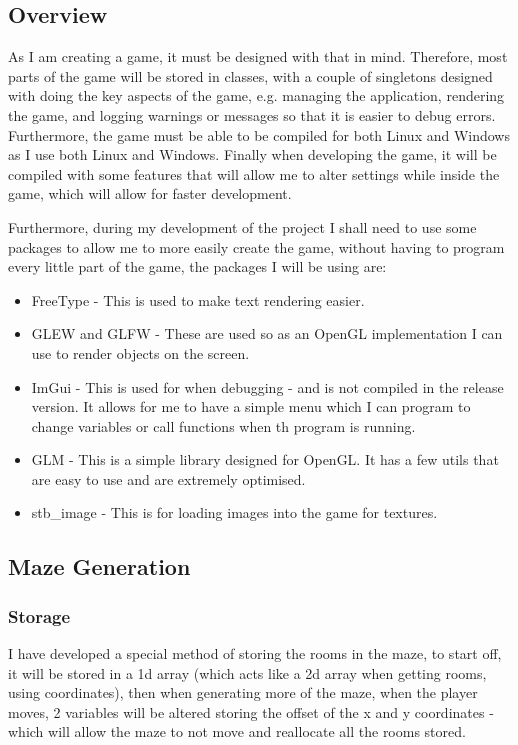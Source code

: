 \documentclass[../Main.tex]{subfiles}
\begin{document}
    \subsection{Overview}
        As I am creating a game, it must be designed with that in mind. Therefore, most parts of the game will be stored in classes, with a couple of singletons designed with doing the key aspects of the game, e.g. managing the application, rendering the game, and logging warnings or messages so that it is easier to debug errors. Furthermore, the game must be able to be compiled for both Linux and Windows as I use both Linux and Windows. Finally when developing the game, it will be compiled with some features that will allow me to alter settings while inside the game, which will allow for faster development.

        Furthermore, during my development of the project I shall need to use some packages to allow me to more easily create the game, without having to program every little part of the game, the packages I will be using are:
        \begin{itemize}
            \item FreeType - This is used to make text rendering easier.
            \item GLEW and GLFW - These are used so as an OpenGL implementation I can use to render objects on the screen.
            \item ImGui - This is used for when debugging - and is not compiled in the release version. It allows for me to have a simple menu which I can program to change variables or call functions when th program is running.
            \item GLM - This is a simple library designed for OpenGL. It has a few utils that are easy to use and are extremely optimised.
            \item stb\_image - This is for loading images into the game for textures.
        \end{itemize}

    \subsection{Maze Generation}
        \subsubsection{Storage}
            I have developed a special method of storing the rooms in the maze, to start off, it will be stored in a 1d array (which acts like a 2d array when getting rooms, using coordinates), then when generating more of the maze, when the player moves, 2 variables will be altered storing the offset of the x and y coordinates - which will allow the maze to not move and reallocate all the rooms stored.
\end{document}
